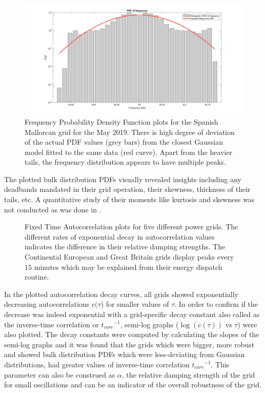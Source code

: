 \begin{figure}[!ht]
	\includegraphics[scale=0.25]{../figures/pdf/pdf_frequency_spain_mallorca_2019_05_f1}
	\caption{Frequency Probability Density Function plots for the Spanish Mallorcan grid for the May 2019. There is high degree of deviation of the actual PDF values (grey bars) from the closest Gaussian model fitted to the same data (red curve). Apart from the heavier tails, the frequency distribution appears to have multiple peaks.}
\end{figure}


The plotted bulk distribution PDFs visually revealed insights including any deadbands \cite{francesca01, vorobev01} mandated in their grid operation, their skewness, thickness of their tails, etc. A quantitative study of their moments like kurtosis and skewness was not conducted as was done in \cite{schafer01}.

\begin{figure}[ht]
	\centering
	\caption{Fixed Time Autocorrelation plots for five different power grids. The different rates of exponential decay in autocorrelation values indicates the difference in their relative damping strengths. The Continental European and Great Britain grids display peaks every $15$ minutes which may be explained from their energy dispatch routine.}
	\label{fig:comp5}
\end{figure}

In the plotted autocorrelation decay curves, all grids showed exponentially decreasing autocorrelations $c(\tau$) for smaller values of $\tau$. In order to confirm if the decrease was indeed exponential with a grid-specific decay constant also called as the inverse-time correlation or ${t_{corr}}^{-1}$, semi-log graphs ($\log(c(\tau))$ vs $\tau$) were also plotted. The decay constants were computed by calculating the slopes of the semi-log graphs and it was found that the grids which were bigger, more robust and showed bulk distribution PDFs which were less-deviating from Gaussian distributions, had greater values of inverse-time correlation ${t_{corr}}^{-1}$. This parameter can also be construed as $\alpha$, the relative damping strength of the grid for small oscillations and can be an indicator of the overall robustness of the grid.

